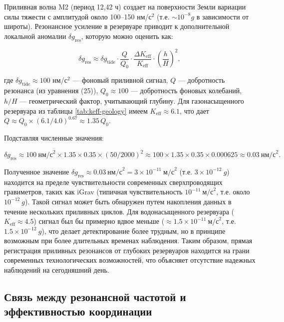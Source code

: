 \documentclass[12pt,a4paper]{article}
\theoremstyle{remark}
\newcommand{\Keff}{K_{\mathrm{eff}}}
\begin{document}
	Приливная волна M2 (период 12,42 ч) создает на поверхности Земли вариации силы тяжести с амплитудой около 100–150 нм/с\(^2\) (т.е. \(\sim 10^{-8} g\) в зависимости от широты). Резонансное усиление в резервуаре приводит к дополнительной локальной аномалии \(\delta g_{\text{res}}\), которую можно оценить как:
	
	\begin{equation}
		\delta g_{\text{res}} \approx \delta g_{\text{tide}} \cdot \frac{Q}{Q_0} \cdot \frac{\Delta \Keff}{\Keff} \cdot \left(\frac{h}{H}\right)^2,
		\label{eq:signal_estimate}
	\end{equation}
	
	где \(\delta g_{\text{tide}} \approx 100\) нм/с\(^2\) — фоновый приливной сигнал, \(Q\) — добротность резонанса (из уравнения (25)), \(Q_0 \approx 100\) — добротность фоновых колебаний, \(h/H\) — геометрический фактор, учитывающий глубину. Для газонасыщенного резервуара из таблицы \ref{tab:keff-geology} имеем \(\Keff \approx 6.1\), что дает \(Q \approx Q_0 \times (6.1/4.0)^{0.67} \approx 1.35\,Q_0\).
	
	Подставляя численные значения:
	
	\[
	\delta g_{\text{res}} \approx 100\ \text{нм/с}^2 \times 1.35 \times 0.35 \times (50/2000)^2 \approx 100 \times 1.35 \times 0.35 \times 0.000625 \approx 0.03\ \text{нм/с}^2.
	\]
	
	Полученное значение \(\delta g_{\text{res}} \approx 0.03\ \text{нм/с}^2 = 3 \times 10^{-11}\ \text{м/с}^2\) (т.е. \(3 \times 10^{-12}\ g\)) находится на пределе чувствительности современных сверхпроводящих гравиметров, таких как iGrav (типичная чувствительность \(10^{-11}\ \text{м/с}^2\), т.е. около \(10^{-12}\ g\)). Такой сигнал может быть обнаружен путем накопления данных в течение нескольких приливных циклов. Для водонасыщенного резервуара (\(\Keff \approx 4.5\)) сигнал был бы примерно вдвое меньше (\( \approx 1.5\times10^{-11}\ \text{м/с}^2\), т.е. \(1.5\times10^{-12}\ g\)), что делает детектирование более трудным, но в принципе возможным при более длительных временах наблюдения. Таким образом, прямая регистрация приливных резонансов от глубоких резервуаров находится на грани современных технологических возможностей, что объясняет отсутствие надежных наблюдений на сегодняшний день.
	
	\subsection{Связь между резонансной частотой и эффективностью координации}
	\label{subsec:frequency_keff}
	
\end{document}
